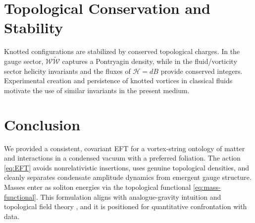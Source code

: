 \documentclass[12pt]{article}
\begin{document}
    \section{Topological Conservation and Stability}

    Knotted configurations are stabilized by conserved topological charges. In the gauge sector, $\mathcal{W}\tilde{\mathcal{W}}$ captures a Pontryagin density, while in the fluid/vorticity sector helicity invariants \cite{Moffatt1969,Arnold1998} and the fluxes of $\mathcal{H}=dB$ provide conserved integers. Experimental creation and persistence of knotted vortices in classical fluids \cite{Kleckner2013} motivate the use of similar invariants in the present medium.

    \section{Conclusion}

    We provided a consistent, covariant EFT for a vortex-string ontology of matter and interactions in a condensed vacuum with a preferred foliation. The action \eqref{eq:EFT} avoids nonrelativistic insertions, uses genuine topological densities, and cleanly separates condensate amplitude dynamics from emergent gauge structure. Masses enter as soliton energies via the topological functional \eqref{eq:mass-functional}. This formulation aligns with analogue-gravity intuition \cite{Barcelo2011,Volovik2003} and topological field theory \cite{Faddeev1997,Arnold1998}, and it is positioned for quantitative confrontation with data.


    \printbibliography[title={References}]
\end{document}

